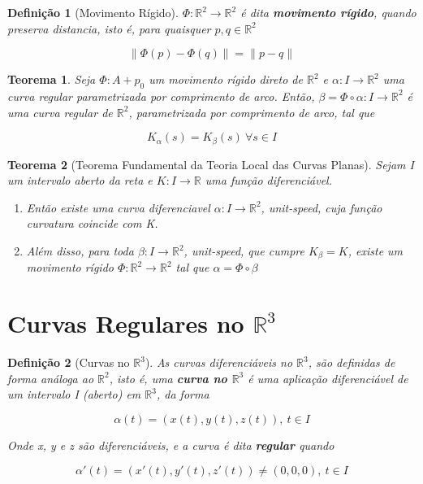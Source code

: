 \documentclass{article}
\newtheorem{theorem}{Teorema}
\newtheorem{definition}{Definição}
\begin{document}
\begin{definition}[Movimento Rígido]
$\Phi: \mathbb{R}^2 \rightarrow \mathbb{R}^2$ é dita \textbf{movimento rígido}, quando preserva distancia, isto é, para quaisquer $p, q \in \mathbb{R}^2$

$$\| \Phi(p) - \Phi(q) \| = \| p - q \|$$
\end{definition}

\begin{theorem}
Seja $\Phi: A + p_0$ um movimento rígido direto de $\mathbb{R}^2$ e $\alpha: I \rightarrow \mathbb{R}^2$ uma curva regular parametrizada por comprimento de arco. Então, $\beta = \Phi \circ \alpha: I \rightarrow \mathbb{R}^2$ é uma curva regular de $\mathbb{R}^2$, parametrizada por comprimento de arco, tal que

$$K_\alpha(s) = K_\beta(s) \ \forall s \in I$$
\end{theorem}

\begin{theorem}[Teorema Fundamental da Teoria Local das Curvas Planas]
Sejam I um intervalo aberto da reta e $K: I \rightarrow \mathbb{R}$ uma função diferenciável.

\begin{enumerate}
    \item Então existe uma curva diferenciavel $\alpha: I \rightarrow \mathbb{R}^2$, unit-speed, cuja função curvatura coincide com K.
    
    \item Além disso, para toda $\beta: I \rightarrow \mathbb{R}^2$, unit-speed, que cumpre $K_\beta = K$, existe um movimento rígido $\Phi: \mathbb{R}^2 \rightarrow \mathbb{R}^2$ tal que $\alpha = \Phi \circ \beta$
\end{enumerate}
\end{theorem}

\section*{Curvas Regulares no $\mathbb{R}^3$}
\label{s5}

\begin{definition}[Curvas no $\mathbb{R}^3$]
As curvas diferenciáveis no $\mathbb{R}^3$, são definidas de forma análoga ao $\mathbb{R}^2$, isto é, uma \textbf{curva no $\mathbb{R}^3$} é uma aplicação diferenciável de um intervalo I (aberto) em $\mathbb{R}^3$, da forma

$$\alpha(t) = (x(t), y(t), z(t)),\ t \in I$$

Onde x, y e z são diferenciáveis, e a curva é dita \textbf{regular} quando

$$\alpha'(t) = (x'(t), y'(t), z'(t)) \neq (0, 0, 0),\ t \in I$$
\end{definition}
\end{document}
